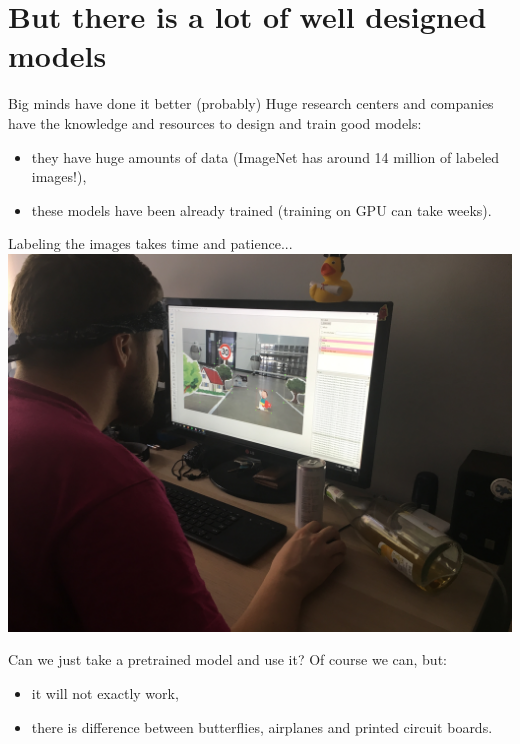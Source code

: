\documentclass[aspectratio=1610,english]{beamer} %
\begin{document}
 	\section{But there is a lot of well designed models}
	\begin{frame}{Big minds have done it better (probably)}
	Huge research centers and companies have the knowledge and resources to design and train good models:
		 \begin{itemize}
		 	\item they have huge amounts of data (ImageNet has around 14 million of labeled images!),
		 	\item these models have been already trained (training on GPU can take weeks).
		 \end{itemize}
	\end{frame}

	\begin{frame}{Labeling the images takes time and patience...}
		\includegraphics[scale=0.1]{images/kuba}
	\end{frame}

 	\begin{frame}{Can we just take a pretrained model and use it?}
 		Of course we can, but:
		 \begin{itemize}
		 	\item it will not exactly work,
		 	\item there is difference between butterflies, airplanes and printed circuit boards.
		 \end{itemize}
	\end{frame}
\end{document}
